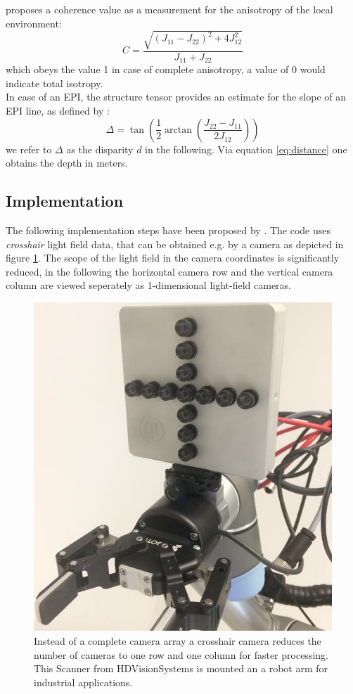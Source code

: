 \documentclass  [
  paper    = a4,
  BCOR     = 10mm,
  twoside,
  fontsize = 12pt,
  fleqn,
  toc      = bibnumbered,
  toc      = listofnumbered,
  numbers  = noendperiod,
  headings = normal,
  listof   = leveldown,
  version  = 3.03
]                                       {scrreprt}
\begin{document}
   \cite{jahne2013digitale} proposes a coherence value as a measurement for the anisotropy of the local environment:
 \begin{equation}\label{eq:coherence}
 C = \frac{\sqrt{(J_{11} - J_{22})^2 + 4J_{12}^2}}{J_{11} + J_{22}}
 \end{equation}
 which obeys the value 1 in case of complete anisotropy, a value of 0 would indicate total isotropy.\\
 In case of an EPI, the structure tensor provides an estimate for the slope of an EPI line, as defined by \cite{bigun1987optimal}:
 \begin{equation}\label{eq:disparity}
 \Delta = \tan\left(\frac{1}{2} \arctan\left( \frac{J_{22}-J_{11}}{2J_{12}}\right)\right)
 \end{equation}
 we refer to $\Delta$ as the disparity $d$ in the following. Via equation \ref{eq:distance} one obtains the depth in meters.
 
 \subsection{Implementation}
 The following implementation steps have been proposed by \cite{wanner2014orientation}. The code uses \textit{crosshair} light field data, that can be obtained e.g. by a camera as depicted in figure \ref{fig:lumiplus}. The scope of the light field in the camera coordinates is significantly reduced, in the following the horizontal camera row and the vertical camera column are viewed seperately as 1-dimensional light-field cameras.\\
 \begin{figure}[]
 	\centering
 	\includegraphics[width=0.7\linewidth]{images/Lumiplus}
 	\caption[LumiPlus Scanner from HDVisionSystems]{Instead of a complete camera array a crosshair camera reduces the number of cameras to one row and one column for faster processing. This Scanner from HDVisionSystems is mounted an a robot arm for industrial applications.}
 	\label{fig:lumiplus}
 \end{figure}
 
\end{document}
